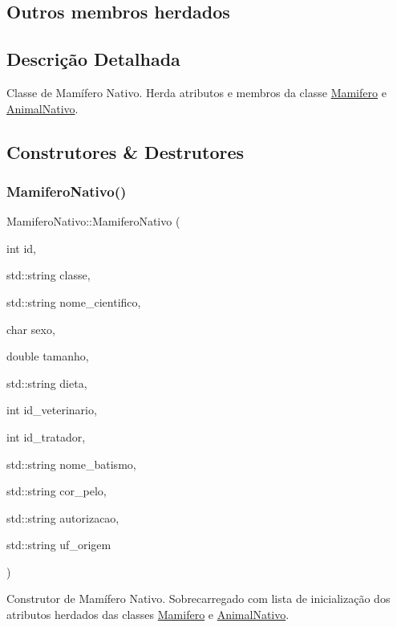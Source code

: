 \subsection*{Outros membros herdados}


\subsection{Descrição Detalhada}
Classe de Mamífero Nativo. Herda atributos e membros da classe \hyperlink{classMamifero}{Mamifero} e \hyperlink{classAnimalNativo}{Animal\+Nativo}. 

\subsection{Construtores \& Destrutores}
\mbox{\label{classMamiferoNativo_a9cea805fd23290d730d8c320ac8075bd}} 
\subsubsection{\texorpdfstring{Mamifero\+Nativo()}{MamiferoNativo()}}
{\footnotesize\ttfamily Mamifero\+Nativo\+::\+Mamifero\+Nativo (\begin{DoxyParamCaption}\item[{int}]{id,  }\item[{std\+::string}]{classe,  }\item[{std\+::string}]{nome\+\_\+cientifico,  }\item[{char}]{sexo,  }\item[{double}]{tamanho,  }\item[{std\+::string}]{dieta,  }\item[{int}]{id\+\_\+veterinario,  }\item[{int}]{id\+\_\+tratador,  }\item[{std\+::string}]{nome\+\_\+batismo,  }\item[{std\+::string}]{cor\+\_\+pelo,  }\item[{std\+::string}]{autorizacao,  }\item[{std\+::string}]{uf\+\_\+origem }\end{DoxyParamCaption})}

Construtor de Mamífero Nativo. Sobrecarregado com lista de inicialização dos atributos herdados das classes \hyperlink{classMamifero}{Mamifero} e \hyperlink{classAnimalNativo}{Animal\+Nativo}. \mbox{\label{classMamiferoNativo_aa08f523498d6713873a29747024e5717}} 
